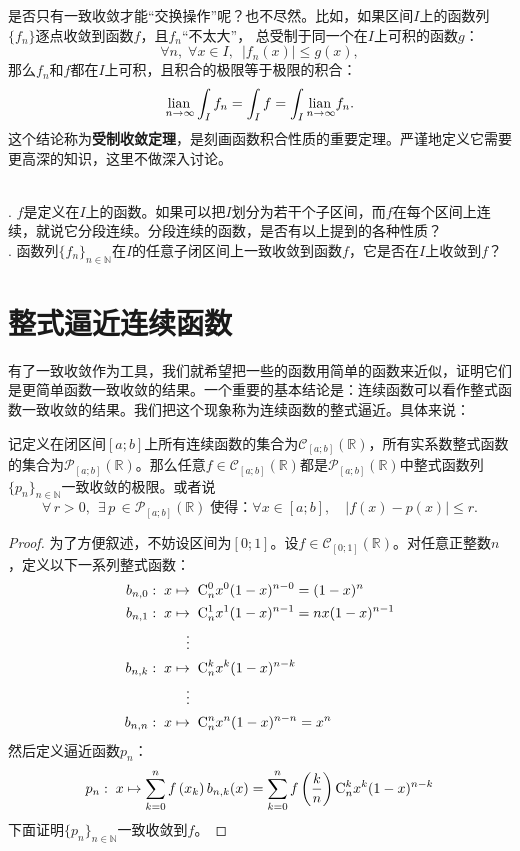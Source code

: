 \documentclass[12pt,UTF8,fontset=none]{ctexbook}
\begin{document}
\begin{appendix}
是否只有一致收敛才能“交换操作”呢？也不尽然。比如，如果区间$I$上的函数列$\{f_n\}$逐点收敛到函数$f$，且$f_n$“不太大”，
总受制于同一个在$I$上可积的函数$g$：
$$ \forall n, \; \forall x \in I,\,\,\, |f_n(x)| \leqslant g(x), $$
那么$f_n$和$f$都在$I$上可积，且积合的极限等于极限的积合：
$$ \underset{n\to\infty}{\operatorname{lian}\,} \int_I f_n = \int_I f = \int_I \underset{n\to\infty}{\operatorname{lian}\,} f_n. $$
这个结论称为\textbf{受制收敛定理}，是刻画函数积合性质的重要定理。严谨地定义它需要更高深的知识，这里不做深入讨论。

\begin{sk}
    \mbox{} \\
    . $f$是定义在$I$上的函数。如果可以把$I$划分为若干个子区间，而$f$在每个区间上连续，就说它分段连续。分段连续的函数，是否有以上提到的各种性质？\\
    . 函数列$\{f_n\}_{n\in\mathbb{N}}$在$I$的任意子闭区间上一致收敛到函数$f$，它是否在$I$上收敛到$f$？
\end{sk}

\section{整式逼近连续函数}

有了一致收敛作为工具，我们就希望把一些的函数用简单的函数来近似，证明它们是更简单函数一致收敛的结果。一个重要的基本结论是：连续函数可以看作整式函数一致收敛的结果。我们把这个现象称为连续函数的整式逼近。具体来说：

\begin{tm}
    记定义在闭区间$[a;b]$上所有连续函数的集合为$\mathcal{C}_{[a;b]}(\mathbb{R})$，所有实系数整式函数的集合为$\mathcal{P}_{[a;b]}(\mathbb{R})$。那么任意$f\in\mathcal{C}_{[a;b]}(\mathbb{R})$都是$\mathcal{P}_{[a;b]}(\mathbb{R})$中整式函数列$\{p_n\}_{n\in\mathbb{N}}$一致收敛的极限。或者说
    \[ \forall \, r > 0, \;\, \exists \, p \, \in \mathcal{P}_{[a;b]}(\mathbb{R}) \; \mbox{使得：} \forall x\in [a;b],\quad \left| f(x) - p(x) \right| \leqslant r.\]
\end{tm}

\begin{proof}
    为了方便叙述，不妨设区间为$[0;1]$。设$f\in\mathcal{C}_{[0;1]}(\mathbb{R})$。对任意正整数$n$，定义以下一系列整式函数：
    \begin{align*}
        b_{n,0}:\; x &\mapsto \;\mathrm{C}_{n}^{0} x^0(1 - x)^{n-0} = (1 - x)^{n} \\
        b_{n,1}:\; x &\mapsto \;\mathrm{C}_{n}^{1} x^1(1 - x)^{n-1} = nx(1 - x)^{n-1} \\
        &\quad \vdots \\
        b_{n,k}:\; x &\mapsto \;\mathrm{C}_{n}^{k} x^k(1 - x)^{n-k} \\
        &\quad \vdots \\
        b_{n,n}:\; x &\mapsto \;\mathrm{C}_{n}^{n} x^n(1 - x)^{n-n} = x^{n} 
    \end{align*}
    然后定义逼近函数$p_n$：
    \begin{align*}
        p_n: \; x\mapsto \sum_{k=0}^n f\left(x_k\right) b_{n,k}(x) = \sum_{k=0}^n f\left(\frac{k}{n}\right) \mathrm{C}_{n}^{k} x^k(1 - x)^{n-k}
    \end{align*}
    下面证明$\{p_n\}_{n\in\mathbb{N}}$一致收敛到$f$。


\end{proof}
\end{appendix}
\end{document}
